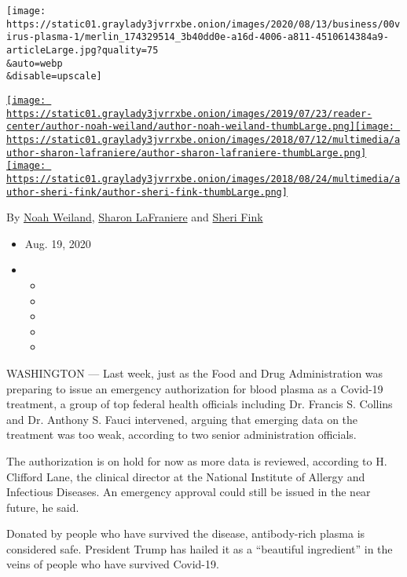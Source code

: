 \texttt{[image: https://static01.graylady3jvrrxbe.onion/images/2020/08/13/business/00virus-plasma-1/merlin\_174329514\_3b40dd0e-a16d-4006-a811-4510614384a9-articleLarge.jpg?quality=75\\\&auto=webp\\\&disable=upscale]}

\href{https://www.nytimes3xbfgragh.onion/by/noah-weiland}{\texttt{[image: https://static01.graylady3jvrrxbe.onion/images/2019/07/23/reader-center/author-noah-weiland/author-noah-weiland-thumbLarge.png]}}\href{https://www.nytimes3xbfgragh.onion/by/sharon-lafraniere}{\texttt{[image: https://static01.graylady3jvrrxbe.onion/images/2018/07/12/multimedia/author-sharon-lafraniere/author-sharon-lafraniere-thumbLarge.png]}}\href{https://www.nytimes3xbfgragh.onion/by/sheri-fink}{\texttt{[image: https://static01.graylady3jvrrxbe.onion/images/2018/08/24/multimedia/author-sheri-fink/author-sheri-fink-thumbLarge.png]}}

By \href{https://www.nytimes3xbfgragh.onion/by/noah-weiland}{Noah
Weiland},
\href{https://www.nytimes3xbfgragh.onion/by/sharon-lafraniere}{Sharon
LaFraniere} and
\href{https://www.nytimes3xbfgragh.onion/by/sheri-fink}{Sheri Fink}

\begin{itemize}
\item
  Aug. 19, 2020
\item
  \begin{itemize}
  \item
  \item
  \item
  \item
  \item
  \end{itemize}
\end{itemize}

WASHINGTON --- Last week, just as the Food and Drug Administration was
preparing to issue an emergency authorization for blood plasma as a
Covid-19 treatment, a group of top federal health officials including
Dr. Francis S. Collins and Dr. Anthony S. Fauci intervened, arguing that
emerging data on the treatment was too weak, according to two senior
administration officials.

The authorization is on hold for now as more data is reviewed, according
to H. Clifford Lane, the clinical director at the National Institute of
Allergy and Infectious Diseases. An emergency approval could still be
issued in the near future, he said.

Donated by people who have survived the disease, antibody-rich plasma is
considered safe. President Trump has hailed it as a ``beautiful
ingredient'' in the veins of people who have survived Covid-19.

